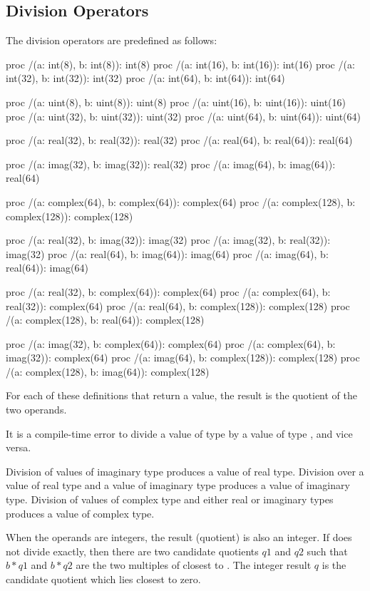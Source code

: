 \subsection{Division Operators}
\label{Division_Operators}

The division operators are predefined as follows:
\begin{chapel}
proc /(a: int(8), b: int(8)): int(8)
proc /(a: int(16), b: int(16)): int(16)
proc /(a: int(32), b: int(32)): int(32)
proc /(a: int(64), b: int(64)): int(64)

proc /(a: uint(8), b: uint(8)): uint(8)
proc /(a: uint(16), b: uint(16)): uint(16)
proc /(a: uint(32), b: uint(32)): uint(32)
proc /(a: uint(64), b: uint(64)): uint(64)

proc /(a: real(32), b: real(32)): real(32)
proc /(a: real(64), b: real(64)): real(64)

proc /(a: imag(32), b: imag(32)): real(32)
proc /(a: imag(64), b: imag(64)): real(64)

proc /(a: complex(64), b: complex(64)): complex(64)
proc /(a: complex(128), b: complex(128)): complex(128)

proc /(a: real(32), b: imag(32)): imag(32)
proc /(a: imag(32), b: real(32)): imag(32)
proc /(a: real(64), b: imag(64)): imag(64)
proc /(a: imag(64), b: real(64)): imag(64)

proc /(a: real(32), b: complex(64)): complex(64)
proc /(a: complex(64), b: real(32)): complex(64)
proc /(a: real(64), b: complex(128)): complex(128)
proc /(a: complex(128), b: real(64)): complex(128)

proc /(a: imag(32), b: complex(64)): complex(64)
proc /(a: complex(64), b: imag(32)): complex(64)
proc /(a: imag(64), b: complex(128)): complex(128)
proc /(a: complex(128), b: imag(64)): complex(128)
\end{chapel}
For each of these definitions that return a value, the result is the
quotient of the two operands.

It is a compile-time error to divide a value of type  by
a value of type , and vice versa.

Division of values of imaginary type produces a value of real type.
Division over a value of real type and a value of imaginary type
produces a value of imaginary type.  Division of values of complex
type and either real or imaginary types produces a value of complex
type.

When the operands are integers, the result (quotient) is also an integer.  If 
does not divide  exactly, then there are two candidate quotients $q1$ and $q2$
such that $b * q1$ and $b * q2$ are the two multiples of  closest to .
The integer result $q$ is the candidate quotient which lies closest to zero.

